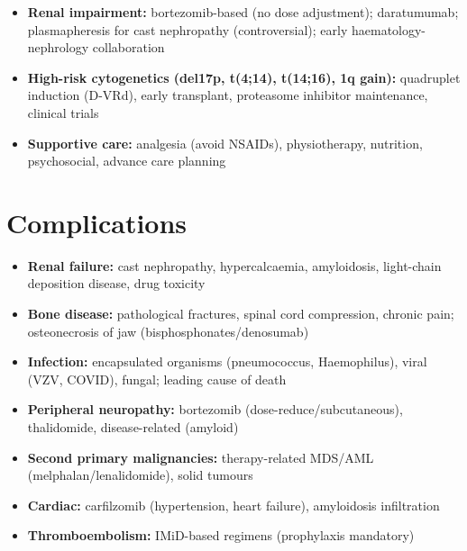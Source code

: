 \begin{itemize}
\begin{itemize}
        \item XPO1 inhibitor: selinexor + dexamethasone
        \item BCMA-targeted: teclistamab, talquetamab, elranatamab (bispecifics); ide-cel, cilta-cel (CAR-T) -- later lines
        \item Belantamab mafodotin (ADC) -- withdrawn in US, available elsewhere
        \item Clinical trials strongly encouraged
    \end{itemize}
    \item \textbf{Renal impairment:} bortezomib-based (no dose adjustment); daratumumab; plasmapheresis for cast nephropathy (controversial); early haematology-nephrology collaboration
    \item \textbf{High-risk cytogenetics (del17p, t(4;14), t(14;16), 1q gain):} quadruplet induction (D-VRd), early transplant, proteasome inhibitor maintenance, clinical trials
    \item \textbf{Supportive care:} analgesia (avoid NSAIDs), physiotherapy, nutrition, psychosocial, advance care planning
\end{itemize}

\section*{Complications}
\begin{itemize}
    \item \textbf{Renal failure:} cast nephropathy, hypercalcaemia, amyloidosis, light-chain deposition disease, drug toxicity
    \item \textbf{Bone disease:} pathological fractures, spinal cord compression, chronic pain; osteonecrosis of jaw (bisphosphonates/denosumab)
    \item \textbf{Infection:} encapsulated organisms (pneumococcus, Haemophilus), viral (VZV, COVID), fungal; leading cause of death
    \item \textbf{Peripheral neuropathy:} bortezomib (dose-reduce/subcutaneous), thalidomide, disease-related (amyloid)
    \item \textbf{Second primary malignancies:} therapy-related MDS/AML (melphalan/lenalidomide), solid tumours
    \item \textbf{Cardiac:} carfilzomib (hypertension, heart failure), amyloidosis infiltration
    \item \textbf{Thromboembolism:} IMiD-based regimens (prophylaxis mandatory)
\end{itemize}

